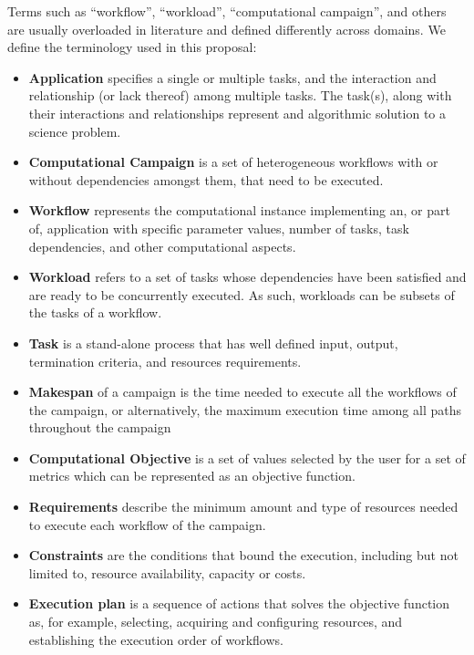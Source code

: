 \label{definitions}
Terms such as ``workflow'', ``workload'', ``computational campaign'', and others are usually overloaded in literature and defined differently across domains. We define the terminology used in this proposal:
\begin{itemize}
    \item \textbf{Application} specifies a single or multiple tasks, and the interaction and relationship (or lack thereof) among multiple tasks. The task(s), along with their interactions and relationships represent and algorithmic solution to a science problem.
    \item \textbf{Computational Campaign} is a set of heterogeneous workflows with or without dependencies amongst them, that need to be executed.
    \item \textbf{Workflow} represents the computational instance implementing an, or part of, application with specific parameter values, number of tasks, task dependencies, and other computational aspects.
    \item \textbf{Workload} refers to a set of tasks whose dependencies have been satisfied and are ready to be concurrently executed. As such, workloads can be subsets of the tasks of a workflow.
    \item \textbf{Task} is a stand-alone process that has well defined input, output, termination criteria, and resources requirements.
    \item \textbf{Makespan} of a campaign is the time needed to execute all the workflows of the campaign, or alternatively, the maximum execution time among all paths throughout the campaign~\cite{chirkin2017execution}
    \item \textbf{Computational Objective} is a set of values selected by the user for a set of metrics which can be represented as an objective function.
    \item \textbf{Requirements} describe the minimum amount and type of resources needed to execute  each workflow of the campaign.
    \item \textbf{Constraints} are the conditions that bound the execution, including but not limited to, resource availability, capacity or costs.
    \item \textbf{Execution plan} is a sequence of actions that solves the objective function as, for example, selecting, acquiring and configuring resources, and establishing the execution order of workflows.
\end{itemize}
